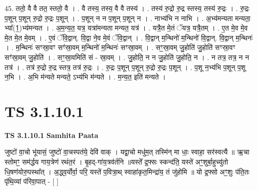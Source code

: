 \documentclass[17pt]{extarticle}
\begin{document}
45. ततो॒ वै वै तत॒ स्ततो॒ वै । . वै तस्य॒ तस्य॒ वै वै तस्य॑ । . तस्य॑ रु॒द्रो रु॒द्र स्तस्य॒ तस्य॑ रु॒द्रः । . रु॒द्रः प॒शून् प॒शून् रु॒द्रो रु॒द्रः प॒शून् । . प॒शून् न न प॒शून् प॒शून् न । . नाभ्य॑भि न नाभि । . अ॒भ्य॑मन्यता मन्यता॒ भ्या᳚(1॒)भ्य॑मन्यत । . अ॒म॒न्य॒त॒ यत्र॒ यत्रा॑मन्यता मन्यत॒ यत्र॑ । . यत्रै॒त मे॒तं ॅयत्र॒ यत्रै॒तम् । . ए॒त मे॒व मे॒व मे॒त मे॒त मे॒वम् । . ए॒वं ॅवि॒द्वान्. वि॒द्वा ने॒व मे॒वं ॅवि॒द्वान् । . वि॒द्वान् म॒न्थिनो॑ म॒न्थिनो॑ वि॒द्वान्. वि॒द्वान् म॒न्थिनः॑ । . म॒न्थिनः॑ सꣳस्रा॒वꣳ सꣳ॑स्रा॒वम् म॒न्थिनो॑ म॒न्थिनः॑ सꣳस्रा॒वम् । . सꣳ॒॒स्रा॒वम् जु॒होति॑ जु॒होति॑ सꣳस्रा॒वꣳ सꣳ॑स्रा॒वम् जु॒होति॑ । . सꣳ॒॒स्रा॒वमिति॑ सं - स्रा॒वम् । . जु॒होति॒ न न जु॒होति॑ जु॒होति॒ न । . न तत्र॒ तत्र॒ न न तत्र॑ । . तत्र॑ रु॒द्रो रु॒द्र स्तत्र॒ तत्र॑ रु॒द्रः । . रु॒द्रः प॒शून् प॒शून् रु॒द्रो रु॒द्रः प॒शून् । . प॒शू न॒भ्य॑भि प॒शून् प॒शू न॒भि । . अ॒भि म॑न्यते मन्यते॒ ऽभ्य॑भि म॑न्यते । . म॒न्य॒त॒ इति॑ मन्यते । \newline
\pagebreak
{}

\section{ TS 3.1.10.1 }

\textbf{TS 3.1.10.1 } \newline
\textbf{Samhita Paata} \newline

जुष्टो॑ वा॒चो भू॑यासं॒ जुष्टो॑ वा॒चस्पत॑ये॒ देवि॑ वाक् । यद्वा॒चो मधु॑म॒त् तस्मि॑न् मा धाः॒ स्वाहा॒ सर॑स्वत्यै ॥ ऋ॒चा स्तोमꣳ॒॒ सम॑र्द्धय गाय॒त्रेण॑ रथंत॒रं । बृ॒हद्-गा॑य॒त्रव॑र्तनि ॥यस्ते᳚ द्र॒फ्सः स्कन्द॑ति॒ यस्ते॑ अꣳ॒॒शुर्बा॒हुच्यु॑तो धि॒षण॑योरु॒पस्था᳚त् । अ॒द्ध्व॒र्योर्वा॒ परि॒ यस्ते॑ प॒वित्रा॒थ् स्वाहा॑कृत॒मिन्द्रा॑य॒ तं जु॑होमि ॥ यो द्र॒फ्सो अꣳ॒॒शुः प॑ति॒तः पृ॑थि॒व्यां प॑रिवा॒पात् - [  ] \newline
\end{document}
